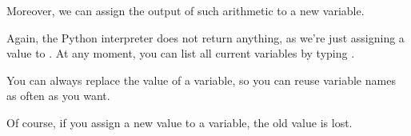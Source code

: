 \documentclass[letterpaper,10pt,english]{jupyterBook}
\begin{document}
\sphinxAtStartPar
Moreover, we can assign the output of such arithmetic to a new variable.

\begin{sphinxVerbatim}[commandchars=\\\{\}]
  
\end{sphinxVerbatim}

\sphinxAtStartPar
Again, the Python interpreter does not return anything, as we’re just assigning a value to . At any moment, you can list all current variables by typing .

\begin{sphinxVerbatim}[commandchars=\\\{\}]
\end{sphinxVerbatim}

\sphinxAtStartPar
You can always replace the value of a variable, so you can reuse variable names as often as you want.

\begin{sphinxVerbatim}[commandchars=\\\{\}]
  
\end{sphinxVerbatim}

\sphinxAtStartPar
Of course, if you assign a new value to a variable, the old value is lost.
\end{document}
